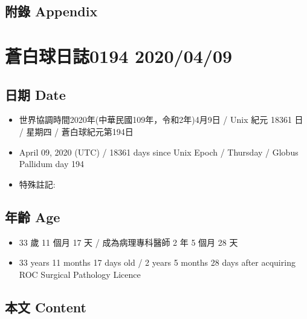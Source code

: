 \documentclass[a5paper, 12pt
]{book}
\providecommand{\tightlist}{%
  \setlength{\itemsep}{0pt}\setlength{\parskip}{0pt}}
\begin{document}
\hypertarget{ux9644ux9304-appendix-38}{%
\subsection{附錄 Appendix}\label{ux9644ux9304-appendix-38}}

\hypertarget{ux84bcux767dux7403ux65e5ux8a8c0194-20200409}{%
\section{蒼白球日誌0194
2020/04/09}\label{ux84bcux767dux7403ux65e5ux8a8c0194-20200409}}

\hypertarget{ux65e5ux671f-date-39}{%
\subsection{日期 Date}\label{ux65e5ux671f-date-39}}

\begin{itemize}
\tightlist
\item
  世界協調時間2020年(中華民國109年，令和2年)4月9日 / Unix 紀元 18361 日
  / 星期四 / 蒼白球紀元第194日
\item
  April 09, 2020 (UTC) / 18361 days since Unix Epoch / Thursday / Globus
  Pallidum day 194
\item
  特殊註記:
\end{itemize}

\hypertarget{ux5e74ux9f61-age-39}{%
\subsection{年齡 Age}\label{ux5e74ux9f61-age-39}}

\begin{itemize}
\tightlist
\item
  33 歲 11 個月 17 天 / 成為病理專科醫師 2 年 5 個月 28 天
\item
  33 years 11 months 17 days old / 2 years 5 months 28 days after
  acquiring ROC Surgical Pathology Licence
\end{itemize}

\hypertarget{ux672cux6587-content-39}{%
\subsection{本文 Content}\label{ux672cux6587-content-39}}
\end{document}
